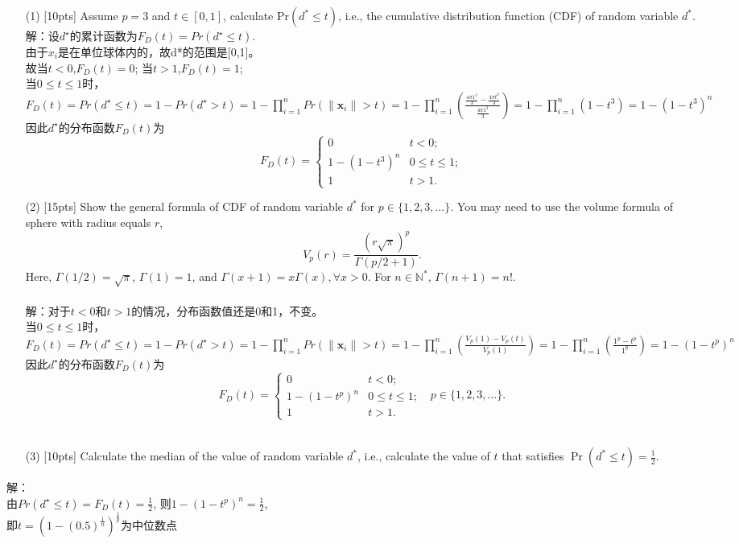 \documentclass{article}
\begin{document}
	\begin{enumerate}
		\item [(1)] [10pts] Assume $ p = 3$ and $ t \in [0, 1]$, calculate Pr$(d^* \leq t)$, i.e., the cumulative distribution function (CDF) of random variable $d^*$.
\\解：设$d^{\star}$的累计函数为$F_D(t)=Pr(d^\star\leq t)$.\\
由于$x_i$是在单位球体内的，故d*的范围是[0,1]。\\故当$t<0$,$F_D(t)=0$; 当$t>1$,$F_D(t)=1$; \\当$0\leq t\leq 1$时，$F_D(t)=Pr(d^\star\leq t)=1-Pr(d^\star >t)=1-\prod \limits_{i=1}^nPr(\|\bm{x}_i\|>t)=1-\prod \limits_{i=1}^n(\frac{\frac{4\pi1^3}{3}-\frac{4\pi t^3}{3}}{\frac{4\pi 1^3}{3}})=1-\prod \limits_{i=1}^n(1-t^3)=1-(1-t^3)^n$\\
因此$d^\star$的分布函数$F_D(t)$为
	\begin{equation}
	F_D(t)=\begin{cases}
	0 & t<0;\\
	1-(1-t^3)^n & 0\leq t\leq 1;\\
	1 & t>1.
	\end{cases}
	\end{equation} 
		\item [(2)] [15pts] Show the general formula of CDF of random variable $d^*$ for $p \in \{1, 2, 3, \dots \}$. You may need to use the volume formula of sphere with radius equals $r$,
				\begin{equation}
				V_{p}(r)=\frac{(r \sqrt{\pi})^{p}}{\Gamma(p / 2+1)}.
				\end{equation}
				Here, $\Gamma(1 / 2)=\sqrt{\pi}$, $\Gamma(1)=1$, and $\Gamma(x+1)=x \Gamma(x), \forall x > 0$. For $n \in \mathbb{N}^*$, $\Gamma(n+1)=n!$.\\\\
解：对于$t<0$和$t>1$的情况，分布函数值还是0和1，不变。\\当$0\leq t\leq 1$时，$F_D(t)=Pr(d^\star\leq t)=1-Pr(d^\star >t)=1-\prod \limits_{i=1}^nPr(\|\bm{x}_i\|>t)=1-\prod \limits_{i=1}^n(\frac{V_p(1)-V_p(t)}{V_p(1)})=1-\prod \limits_{i=1}^n(\frac{1^p-t^p}{1^p})=1-(1-t^p)^n$\\
因此$d^\star$的分布函数$F_D(t)$为
	\begin{equation}
	F_D(t)=\begin{cases}
	0 & t<0;\\
	1-(1-t^p)^n & 0\leq t\leq 1;\\
	1 & t>1.
	\end{cases}
	\ \ \ p \in \{1, 2, 3, \dots \}.
	\end{equation} 
\\
		\item [(3)] [10pts] Calculate the median of the value of random variable $d^*$, i.e., calculate the value of $t$ that satisfies $\operatorname{Pr}\left(d^{*} \leq t\right)= \frac{1}{2}$.
	\end{enumerate}
解：\\由$Pr(d^\star \leq t)=F_D(t)=\frac{1}{2}$, 则$1-(1-t^p)^n=\frac{1}{2}$,\\即$t=(1-(0.5)^{\frac{1}{n}})^{\frac{1}{p}}$为中位数点	
	\newpage
	
\end{document}
